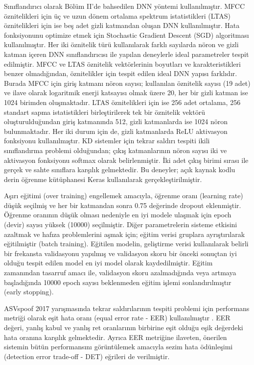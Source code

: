 \documentclass[conference, a4paper]{IEEEtran}
\begin{document}
Sınıflandırıcı olarak Bölüm II'de bahsedilen DNN yöntemi kullanılmıştır. MFCC öznitelikleri için üç ve uzun dönem
ortalama spektrum istatistikleri (LTAS) öznitelikleri için ise beş adet gizli katmandan oluşan DNN kullanılmıştır.
Hata fonksiyonunu optimize etmek için Stochastic Gradient Descent (SGD) algoritması kullanılmıştır. Her iki öznitelik
türü kullanılarak farklı sayılarda nöron ve gizli katman içeren DNN sınıflandırıcısı ile yapılan deneylerle ideal
parametreler tespit edilmiştir. MFCC ve LTAS öznitelik vektörlerinin boyutları ve karakteristikleri benzer olmadığından,
öznitelikler için tespit edilen ideal DNN yapısı farklıdır. Burada MFCC için giriş katmanı nöron sayısı; kullanılan
öznitelik sayısı (19 adet) ve ilave olarak logaritmik enerji katsayısı olmak üzere 20, her bir gizli katman ise 1024
birimden oluşmaktadır. LTAS öznitelikleri için ise 256 adet ortalama, 256 standart sapma istatistikleri birleştirilerek
tek bir öznitelik vektörü oluşturulduğundan giriş katmanında 512, gizli katmanlarda ise 1024 nöron bulunmaktadır. Her
iki durum için de, gizli katmanlarda ReLU aktivasyon fonksiyonu kullanılmıştır. KD sistemler için tekrar saldırı
tespiti ikili sınıflandırma problemi olduğundan; çıkış katmanlarının nöron sayısı iki ve aktivasyon fonksiyonu softmax
olarak belirlenmiştir. İki adet çıkış birimi sırası ile gerçek ve sahte sınıflara karşılık gelmektedir. Bu deneyler;
açık kaynak kodlu derin öğrenme kütüphanesi Keras\cite{keras} kullanılarak gerçekleştirilmiştir.

Aşırı eğitimi (over training) engellemek amacıyla, öğrenme oranı (learning rate) düşük seçilmiş ve her bir katmandan
sonra 0.75 değerinde dropout\cite{srivastava2014dropout} eklenmiştir. Öğrenme oranının düşük olması nedeniyle en iyi
modele ulaşmak için epoch (devir) sayısı yüksek (10000) seçilmiştir. Diğer parametrelerin sisteme etkisini azaltmak
\cite{li2014efficient} ve hafıza problemlerini aşmak için; eğitim verisi gruplara ayrıştırılarak eğitilmiştir (batch
training). Eğitilen modelin, geliştirme verisi kullanılarak belirli bir frekansta validasyonu yapılmış ve validasyon
skoru bir önceki sonuçtan iyi olduğu tespit edilen model en iyi model olarak kaydedilmiştir. Eğitim zamanından tasarruf
amacı ile, validasyon skoru azalmadığında veya artmaya başladığında 10000 epoch sayısı beklenmeden eğitim işlemi
sonlandırılmıştır (early stopping).

ASVspoof 2017 yarışmasında tekrar saldırılarının tespiti problemi için performans metriği olarak eşit hata oranı
(equal error rate - EER) kullanılmıştır \cite{kinnunen2017asvspoof,kinnunen2017asvspoof1}. EER değeri, yanlış kabul ve
yanlış ret oranlarının birbirine eşit olduğu eşik değerdeki hata oranına karşılık gelmektedir. Ayrıca EER metriğine
ilaveten, önerilen sistemin bütün performansını görüntülemek amacıyla sezim hata ödünleşimi (detection error
trade-off - DET) \cite{martin1997det} eğrileri de verilmiştir.
\end{document}

